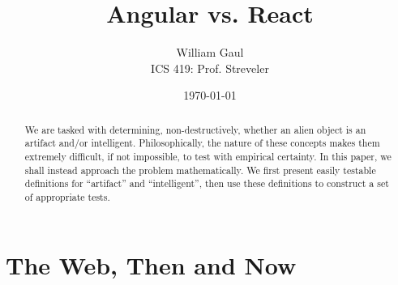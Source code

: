 \documentclass[12pt,letterpaper]{article}
\title{\textbf{Angular vs. React}}
\author{William Gaul\\{ICS 419: Prof. Streveler}}
\date{\today}
\begin{document}
\maketitle

\renewcommand{\abstractname}{Executive Summary}
\begin{abstract}
	We are tasked with determining, non-destructively, whether an alien object is an artifact and/or intelligent. Philosophically, the nature of these concepts makes them extremely difficult, if not impossible, to test with empirical certainty. In this paper, we shall instead approach the problem mathematically. We first present easily testable definitions for ``artifact'' and ``intelligent'', then use these definitions to construct a set of appropriate tests.
\end{abstract}

\section{The Web, Then and Now}


\end{document}
